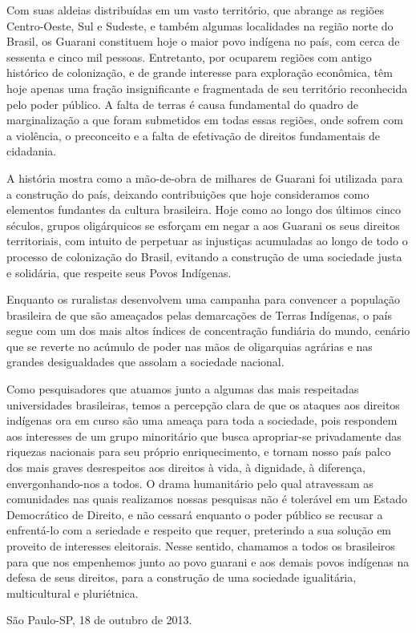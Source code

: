 Com suas aldeias distribuídas em um vasto território, que abrange as
regiões Centro-Oeste, Sul e Sudeste, e também algumas localidades na
região norte do Brasil, os Guarani constituem hoje o maior povo indígena
no país, com cerca de sessenta e cinco mil pessoas. Entretanto, por
ocuparem regiões com antigo histórico de colonização, e de grande
interesse para exploração econômica, têm hoje apenas uma fração
insignificante e fragmentada de seu território reconhecida pelo poder
público. A falta de terras é causa fundamental do quadro de
marginalização a que foram submetidos em todas essas regiões, onde
sofrem com a violência, o preconceito e a falta de efetivação de
direitos fundamentais de cidadania.

A história mostra como a mão-de-obra de milhares de Guarani foi
utilizada para a construção do país, deixando contribuições que hoje
consideramos como elementos fundantes da cultura brasileira. Hoje como
ao longo dos últimos cinco séculos, grupos oligárquicos se esforçam em
negar a aos Guarani os seus direitos territoriais, com intuito de
perpetuar as injustiças acumuladas ao longo de todo o processo de
colonização do Brasil, evitando a construção de uma sociedade justa e
solidária, que respeite seus Povos Indígenas.

Enquanto os ruralistas desenvolvem uma campanha para convencer a
população brasileira de que são ameaçados pelas demarcações de Terras
Indígenas, o país segue com um dos mais altos índices de concentração
fundiária do mundo, cenário que se reverte no acúmulo de poder nas mãos
de oligarquias agrárias e nas grandes desigualdades que assolam a
sociedade nacional.

Como pesquisadores que atuamos junto a algumas das mais respeitadas
universidades brasileiras, temos a percepção clara de que os ataques aos
direitos indígenas ora em curso são uma ameaça para toda a sociedade,
pois respondem aos interesses de um grupo minoritário que busca
apropriar-se privadamente das riquezas nacionais para seu próprio
enriquecimento, e tornam nosso país palco dos mais graves desrespeitos
aos direitos à vida, à dignidade, à diferença, envergonhando-nos a
todos. O drama humanitário pelo qual atravessam as comunidades nas quais
realizamos nossas pesquisas não é tolerável em um Estado Democrático de
Direito, e não cessará enquanto o poder público se recusar a enfrentá-lo
com a seriedade e respeito que requer, preterindo a sua solução em
proveito de interesses eleitorais. Nesse sentido, chamamos a todos os
brasileiros para que nos empenhemos junto ao povo guarani e aos demais
povos indígenas na defesa de seus direitos, para a construção de uma
sociedade igualitária, multicultural e pluriétnica.

São Paulo-SP, 18 de outubro de 2013.
